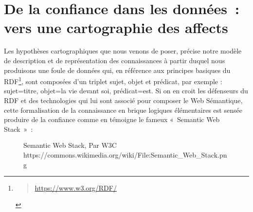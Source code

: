 \documentclass[
  a4paper,
  DIV=11,
  numbers=noendperiod]{scrreprt}
\begin{document}
\section{De la confiance dans les données~: vers une cartographie des
affects}\label{sec-confianceDonnees}

Les hypothèses cartographiques que nous venons de poser, précise notre
modèle de description et de représentation des connaissances à partir
duquel nous produisons une foule de données qui, en référence aux
principes basiques du RDF\footnote{\begin{quote}
  \url{https://www.w3.org/RDF/}
  \end{quote}}, sont composées d'un triplet sujet, objet et prédicat,
par exemple : sujet=titre, objet=la vie devant soi, prédicat=est. Si on
en croit les défenseurs du RDF et des technologies qui lui sont associé
pour composer le Web Sémantique, cette formalisation de la connaissance
en brique logiques élémentaires est sensée produire de la confiance
comme en témoigne le fameux «~Semantic Web Stack~»~:

\begin{figure}


\caption{\label{fig-semanticWebStack}Semantic Web Stack, Par W3C
https://commons.wikimedia.org/wiki/File:Semantic\_Web\_Stack.png}

\end{figure}%
\end{document}
